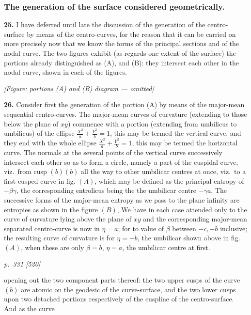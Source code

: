 \documentclass[11pt,a4paper]{book}
\begin{document}
\subsubsection*{The generation of the surface considered geometrically.}

\textbf{25.} I have deferred until late the discussion of the generation of the centro-surface by means of the centro-curves, for the reason that it can be carried on more precisely now that we know the forms of the principal sections and of the nodal curve. The two figures exhibit (as regards one extent of the surface) the portions already distinguished as (A), and (B): they intersect each other in the nodal curve, shown in each of the figures.

\begin{center}
\textit{[Figure: portions (A) and (B) diagram --- omitted]}
\end{center}

\textbf{26.} Consider first the generation of the portion (A) by means of the major-mean sequential centro-curves. The major-mean curves of curvature (extending to those below the plane of $xy$) commence with a portion (extending from umbilicus to umbilicus) of the ellipse $\tfrac{X^2}{a} + \tfrac{Y^2}{b} = 1$, this may be termed the vertical curve, and they end with the whole ellipse $\tfrac{X^2}{a} + \tfrac{Y^2}{b} = 1$, this may be termed the horizontal curve. The normals at the several points of the vertical curve successively intersect each other so as to form a circle, namely a part of the cuspidal curve, viz.\ from cusp $(b) (b)$ all the way to other umbilicar centres at once, viz.\ to a first-cusped curve in fig. $(A)$, which may be defined as the principal entropy of $-\beta\gamma$, the corresponding entrolicus being the the umbilicar centre $-\gamma a$. The successive forms of the major-mean entropy as we pass to the plane infinity are entropies as shown in the figure $(B)$, We have in each case attended only to the curve of curvature lying above the plane of $xy$ and the corresponding major-mean separated centro-curve is now in $\eta = a$; for to value of $\beta$ between $-c, -b$ inclusive; the resulting curve of curvature is for $\eta = -b$, the umbilicar shown above in fig. $(A)$, when these are only $\beta = b$, $\eta = a$, the umbilicar centre at first.

\clearpage

\bigskip
\textit{p.~331 [520]}
\smallskip

opening out the two component parts thereof: the two upper cusps of the curve $(b)$ are atomic on the geodesic of the curve-surface, and the two lower cusps upon two detached portions respectively of the cuspline of the centro-surface. And as the curve
\end{document}
